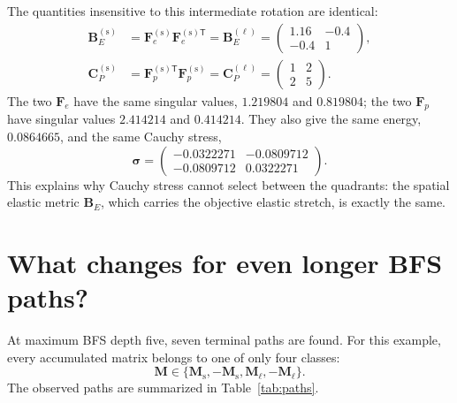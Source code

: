 \documentclass[11pt]{article}
\newcommand{\trans}{\mathsf{T}}
\newcommand{\shortp}{\mathrm{s}}
\newcommand{\longp}{\ell}
\begin{document}
The quantities insensitive to this intermediate rotation are identical:
\begin{align}
 \mathbf B_E^{(\shortp)}
 &=\mathbf F_e^{(\shortp)}\mathbf F_e^{(\shortp)\trans}
 =\mathbf B_E^{(\longp)}
 =\begin{pmatrix}1.16&-0.4\\-0.4&1\end{pmatrix},
 \\
 \mathbf C_P^{(\shortp)}
 &=\mathbf F_p^{(\shortp)\trans}\mathbf F_p^{(\shortp)}
 =\mathbf C_P^{(\longp)}
 =\begin{pmatrix}1&2\\2&5\end{pmatrix}.
 \label{eq:equalmetrics}
\end{align}
The two \(\mathbf F_e\) have the same singular values,
\(1.219804\) and \(0.819804\); the two \(\mathbf F_p\) have singular values
\(2.414214\) and \(0.414214\).  They also give the same energy,
\(0.0864665\), and the same Cauchy stress,
\begin{equation}
 \boldsymbol\sigma=
 \begin{pmatrix}
 -0.0322271&-0.0809712\\
 -0.0809712&0.0322271
 \end{pmatrix}.
\end{equation}
This explains why Cauchy stress cannot select between the quadrants: the
spatial elastic metric \(\mathbf B_E\), which carries the objective elastic
stretch, is exactly the same.

\section{What changes for even longer BFS paths?}

At maximum BFS depth five, seven terminal paths are found.  For this example,
every accumulated matrix belongs to one of only four classes:
\begin{equation}
 \mathbf M\in
 \{\mathbf M_{\shortp},-\mathbf M_{\shortp},
   \mathbf M_{\longp},-\mathbf M_{\longp}\}.
 \label{eq:Mclasses}
\end{equation}
The observed paths are summarized in Table~\ref{tab:paths}.
\end{document}
